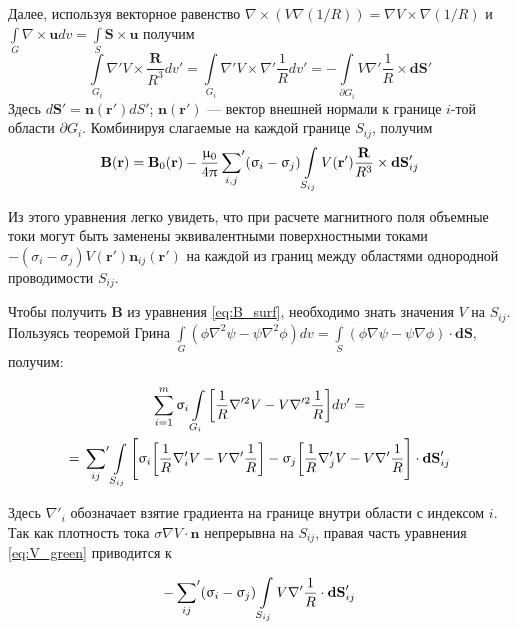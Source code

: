 Далее, используя векторное равенство $\nabla \times (V \nabla(1/R)) = \nabla V \times \nabla (1/R)$
и $\int \limits_{G} \nabla \times \mathbf{u} dv = \int \limits_{S} \mathbf{S}\times\mathbf{u}$
получим
\begin{equation}
    \int \limits_{G_i} \nabla' V \times \frac{\mathbf{R}}{R^3} dv' =
    \int\limits_{G_i} \nabla' V \times \nabla' \frac{1}{R} dv' =
    - \int \limits_{\partial G_i} V \nabla' \frac{1}{R} \times \mathbf{dS}'
\end{equation}
Здесь $d\mathbf{S}' = \mathbf{n}(\mathbf{r}') dS'$; $\mathbf{n}(\mathbf{r}')$ ---
вектор внешней нормали к границе $i$-той области $\partial G_i$. Комбинируя слагаемые на каждой границе $S_{ij}$,
получим
\begin{equation}
        \mathbf{B}(\mathbf{r}) = \mathbf{B}_0(\mathbf{r}) -
        \frac{\mu_0}{4\pi}\sideset{}{'}\sum_{i,j}(\sigma_i - \sigma_j) \int \limits_{S_{ij}} V(\mathbf{r}')
        \frac{\mathbf{R}}{R^3} \times \mathbf{dS}'_{ij}
        \label{eq:B_surf}
\end{equation}

Из этого уравнения легко увидеть, что при расчете магнитного поля  объемные токи могут быть
заменены эквивалентными поверхностными токами
$-(\sigma_i - \sigma_j) V(\mathbf{r}')\mathbf{n}_{ij}(\mathbf{r}')$
на каждой из границ между областями однородной проводимости $S_{ij}$.

Чтобы получить $\mathbf{B}$ из уравнения \ref{eq:B_surf}, необходимо знать значения $V$ на $S_{ij}$.
Пользуясь теоремой Грина $\int\limits_{G}(\phi\nabla^2\psi - \psi\nabla^2\phi)dv = \int\limits_{S}(\phi\nabla\psi-\psi\nabla\phi)\cdot \mathbf{dS}$, получим:

\begin{multline}
    \sum_{i=1}^m\sigma_i\int\limits_{G_i} \bigg[\frac{1}{R} \nabla'^2V - V\nabla'^2 \frac{1}{R}\bigg]dv'=\\
    = \sideset{}{'}\sum_{ij}\int\limits_{S_{ij}}\Bigg[\sigma_i\bigg[\frac{1}{R}\nabla'_iV -
        V\nabla'\frac{1}{R}\bigg] - \sigma_j \bigg[\frac{1}{R}\nabla'_j V - V \nabla'\frac{1}{R}\Bigg]
        \cdot\mathbf{dS}'_{ij}
        \label{eq:V_green}
\end{multline}


Здесь $\nabla'_i$ обозначает взятие градиента на границе внутри области с индексом $i$.
Так как плотность тока $\sigma\nabla V \cdot \mathbf{n}$ непрерывна на $S_{ij}$, правая часть уравнения
\ref{eq:V_green} приводится к

\begin{equation}
    {-\sideset{}{'}\sum_{ij}(\sigma_i - \sigma_j)}
\int\limits_{S_{ij}} V\nabla'\frac{1}{R}\cdot\mathbf{dS}'_{ij}
\end{equation}

